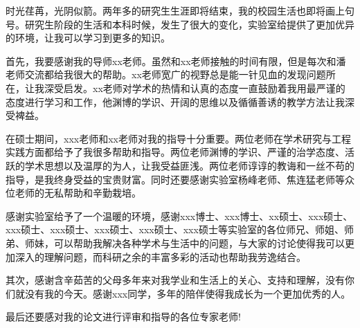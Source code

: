 ﻿%
时光荏苒，光阴似箭。两年多的研究生生涯即将结束，我的校园生活也即将画上句号。研究生阶段的生活和本科时候，发生了很大的变化，实验室给提供了更加优异的环境，让我可以学习到更多的知识。

首先，我要感谢我的导师xx老师。虽然和xx老师接触的时间有限，但是每次和潘老师交流都给我很大的帮助。xx老师宽广的视野总是能一针见血的发现问题所在，让我深受启发。xx老师对学术的热情和认真的态度一直鼓励着我用最严谨的态度进行学习和工作，他渊博的学识、开阔的思维以及循循善诱的教学方法让我深受裨益。

在硕士期间，xxx老师和xx老师对我的指导十分重要。两位老师在学术研究与工程实践方面都给予了我很多帮助和指导。两位老师渊博的学识、严谨的治学态度、活跃的学术思想以及温厚的为人，让我受益匪浅。两位老师谆谆的教诲和一丝不苟的指导，是我终身受益的宝贵财富。同时还要感谢实验室杨峰老师、焦连猛老师等众位老师的无私帮助和辛勤栽培。

感谢实验室给予了一个温暖的环境，感谢xxx博士、xxx博士、xx硕士、xxx硕士、xxx硕士、xxx硕士、xxx硕士、xxx硕士、xxx硕士等实验室的各位师兄、师姐、师弟、师妹，可以帮助我解决各种学术与生活中的问题，与大家的讨论使得我可以更加深入的理解问题，而科研之余的丰富多彩的活动也帮助我劳逸结合。

其次，感谢含辛茹苦的父母多年来对我学业和生活上的关心、支持和理解，没有你们就没有我的今天。感谢xxx同学，多年的陪伴使得我成长为一个更加优秀的人。

最后还要感对我的论文进行评审和指导的各位专家老师!